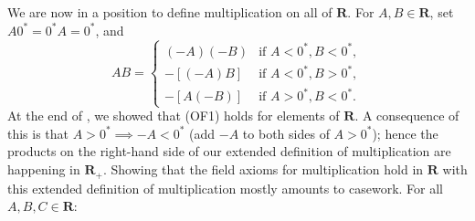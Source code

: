 \documentclass[12pt]{article}
\newcommand{\newp}{\vspace{5mm}}
\newcommand{\R}{\mathbf{R}}
\theoremstyle{definition}
\begin{document}
\newp

We are now in a position to define multiplication on all of \( \R \). For \( A, B \in \R \), set \( A 0^* = 0^* A = 0^* \), and
\[
    AB = \begin{cases}
        (-A)(-B) & \text{if } A < 0^*, B < 0^*, \\
        -[(-A)B] & \text{if } A < 0^*, B > 0^*, \\
        -[A(-B)] & \text{if } A > 0^*, B < 0^*.
    \end{cases}
\]
At the end of , we showed that (OF1) holds for elements of \( \R \). A consequence of this is that \( A > 0^* \implies -A < 0^* \) (add \( -A \) to both sides of \( A > 0^* \)); hence the products on the right-hand side of our extended definition of multiplication are happening in \( \R_+ \). Showing that the field axioms for multiplication hold in \( \R \) with this extended definition of multiplication mostly amounts to casework. For all \( A, B, C \in \R \):
\end{document}
